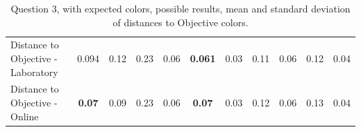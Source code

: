 \begin{table}[H]
{\begin{tabular}{lccccccccccccc}
    \multicolumn{4}{l}{Distance to Objective - Laboratory}                                                                                           & \multicolumn{1}{|c}{0.094}       & \multicolumn{1}{c|}{0.12}    & \multicolumn{1}{|c}{0.23}       & \multicolumn{1}{c|}{0.06}    & \multicolumn{1}{|c}{\textbf{0.061}}       & \multicolumn{1}{c|}{0.03}    & \multicolumn{1}{|c}{0.11}       & \multicolumn{1}{c|}{0.06}    & \multicolumn{1}{|c}{0.12}       & \multicolumn{1}{c|}{0.04}    \\
    \multicolumn{4}{l}{Distance to Objective - Online}                                                                                               & \multicolumn{1}{|c}{\textbf{0.07}}        & \multicolumn{1}{c|}{0.09}    & \multicolumn{1}{|c}{0.23}        & \multicolumn{1}{c|}{0.06}    & \multicolumn{1}{|c}{\textbf{0.07}}       & \multicolumn{1}{c|}{0.03}    & \multicolumn{1}{|c}{0.12}        & \multicolumn{1}{c|}{0.06}    & \multicolumn{1}{|c}{0.13}       & \multicolumn{1}{c|}{0.04}    \\ \hline
    \end{tabular}}
  \caption[Question 3, with expected Results.]{Question 3, with expected colors, possible results, mean and standard deviation of distances to Objective colors.}
  \label{table:lab_q3_expected}
\end{table}
%
